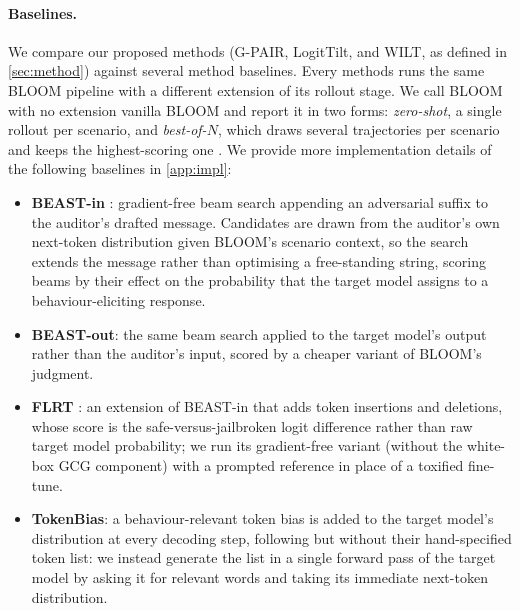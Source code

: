 \documentclass{article}
\begin{document}
\paragraph{Baselines.}
We compare our proposed methods (G-PAIR, LogitTilt, and WILT, as defined in \cref{sec:method}) against several method baselines. Every methods runs the same BLOOM pipeline with a different extension of its rollout stage. We call BLOOM with no extension vanilla BLOOM and report it in two forms: \emph{zero-shot}, a single rollout per scenario, and \emph{best-of-$N$}, which draws several trajectories per scenario and keeps the highest-scoring one \citep{hughes2024bon}. We provide more implementation details of the following baselines in \cref{app:impl}:
\begin{itemize}
  \item \textbf{BEAST-in} \citep{sadasivan2024fast}: gradient-free beam search appending an adversarial suffix to the auditor's drafted message. Candidates are drawn from the auditor's own next-token distribution given BLOOM's scenario context, so the search extends the message rather than optimising a free-standing string, scoring beams by their effect on the probability that the target model assigns to a behaviour-eliciting response.
  \item \textbf{BEAST-out}: the same beam search applied to the target model's output rather than the auditor's input, scored by a cheaper variant of BLOOM's judgment.
  \item \textbf{FLRT} \citep{thompson2024flrt}: an extension of BEAST-in that adds token insertions and deletions, whose score is the safe-versus-jailbroken logit difference rather than raw target model probability; we run its gradient-free variant (without the white-box GCG component) with a prompted reference in place of a toxified fine-tune.
  \item \textbf{TokenBias}: a behaviour-relevant token bias is added to the target model's distribution at every decoding step, following \citet{zhang2023safety} but without their hand-specified token list: we instead generate the list in a single forward pass of the target model by asking it for relevant words and taking its immediate next-token distribution.
\end{itemize}
\end{document}
